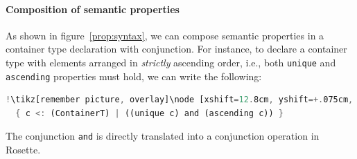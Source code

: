 \paragraph*{Composition of semantic properties} As shown in figure~\ref{prop:syntax}, we can compose semantic properties in a container type declaration with conjunction.
For instance, to declare a container type with elements arranged in \emph{strictly} ascending order, i.e., both \lstinline{unique} and \lstinline{ascending} properties must hold, we can write the following:
\begin{lstlisting}[language=Rust, style=boxed]
!\tikz[remember picture, overlay]\node [xshift=12.8cm, yshift=+.075cm, inner sep=0.075cm, rectangle] {\footnotesize\bfseries\texttt{Primrose}};!type StrictlyAscendingCon<T> = 
  { c <: (ContainerT) | ((unique c) and (ascending c)) }
\end{lstlisting}
The conjunction \lstinline|and| is directly translated into a conjunction operation in Rosette.

